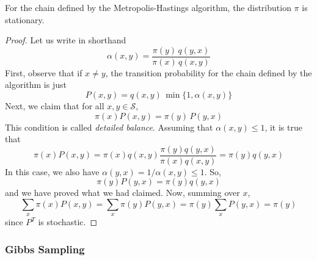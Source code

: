     \begin{proposition}
      For the chain defined by the Metropolis-Hastings algorithm, the distribution $\pi$ is stationary. 
    \end{proposition}
    \begin{proof}
      Let us write in shorthand 
      \begin{equation}
        \alpha(x, y) = \frac{\pi(y)\, q(y, x)}{\pi(x)\, q(x, y)}
      \end{equation}
      First, observe that if $x \neq y$, the transition probability for the chain defined by the algorithm is just
      \begin{equation}
        P(x, y) = q(x, y)\, \min\{1, \alpha(x, y)\}
      \end{equation}
      Next, we claim that for all $x, y \in \mathcal{S}$, 
      \begin{equation}
        \pi(x) P(x, y) = \pi(y) \, P(y, x)
      \end{equation}
      This condition is called \textit{detailed balance}. Assuming that $\alpha(x, y) \leq 1$, it is true that
      \begin{equation}
        \pi(x) P(x, y) = \pi(x) q(x, y) \frac{\pi(y) q(y, x)}{\pi(x) q(x, y)} = \pi(y) q(y, x)
      \end{equation}
      In this case, we also have $\alpha(y, x) = 1 / \alpha(x, y) \leq 1$. So, 
      \begin{equation}
        \pi(y) P(y, x) = \pi(y) q(y, x)
      \end{equation}
      and we have proved what we had claimed. Now, summing over $x$,
      \begin{equation}
        \sum_x \pi(x) P(x, y) = \sum_x \pi(y) P(y, x) = \pi(y) \sum_x P(y, x) = \pi(y)
      \end{equation}
      since $P^T$ is stochastic. 
    \end{proof}

  \subsubsection{Gibbs Sampling}

